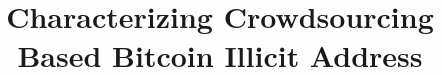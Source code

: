 \documentclass[conference]{IEEEtran}
\begin{document}
\title{Characterizing Crowdsourcing Based Bitcoin Illicit Address}




\maketitle

\begin{abstract}

\end{abstract}








%
%



%



\end{document}
